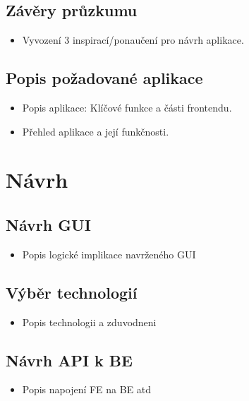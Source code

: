 \documentclass[a4paper,12pt]{article}
\begin{document}
\subsection*{Závěry průzkumu}
\begin{itemize}
    \item Vyvození 3 inspirací/ponaučení pro návrh aplikace.
\end{itemize}

\subsection*{Popis požadované aplikace}
\begin{itemize}
    \item Popis aplikace: Klíčové funkce a části frontendu.
    \item Přehled aplikace a její funkčnosti.
\end{itemize}

\section*{Návrh}
\subsection*{Návrh GUI}
\begin{itemize}
    \item Popis  logické implikace navrženého GUI
\end{itemize}

\subsection*{Výběr technologií}
\begin{itemize}
    \item Popis technologii a zduvodneni
\end{itemize}

\subsection*{Návrh API k BE}
\begin{itemize}
    \item Popis  napojení FE na BE atd
\end{itemize}
\end{document}
